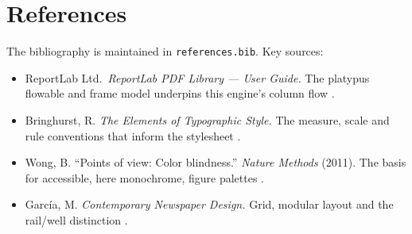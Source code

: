 \documentclass[
  english,
]{article}
\providecommand{\tightlist}{%
  \setlength{\itemsep}{0pt}\setlength{\parskip}{0pt}}
\begin{document}
\newpage

\section{References}\label{references}

The bibliography is maintained in \texttt{references.bib}. Key sources:

\begin{itemize}
\tightlist
\item
  ReportLab Ltd.~\emph{ReportLab PDF Library --- User Guide.} The
  platypus flowable and frame model underpins this engine's column flow
  \citep{reportlab}.
\item
  Bringhurst, R. \emph{The Elements of Typographic Style.} The measure,
  scale and rule conventions that inform the stylesheet
  \citep{bringhurst}.
\item
  Wong, B. ``Points of view: Color blindness.'' \emph{Nature Methods}
  (2011). The basis for accessible, here monochrome, figure palettes
  \citep{wong2011}.
\item
  García, M. \emph{Contemporary Newspaper Design.} Grid, modular layout
  and the rail/well distinction \citep{garcia}.
\end{itemize}



\providecommand{\bibsection}{}
\renewcommand{\bibsection}{}


\end{document}
